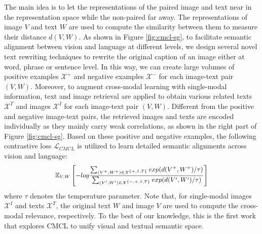 \documentclass[11pt,a4paper]{article}
\begin{document}
The main idea is to let the representations of the paired image and text near in the representation space while the non-paired far away.
The representations of image $V$ and text $W$ are used to compute the similarity between them to measure their distance $d(V, W)$.
As shown in Figure \ref{fig:cmcl-sg}, to facilitate semantic alignment between vision and language at different levels, we design several novel text rewriting techniques to rewrite the original caption of an image either at word, phrase or sentence level.
In this way, we can create large volumes of positive examples $\mathcal{X^+}$ and negative examples $\mathcal{X^-}$ for each image-text pair $(V, W)$.
Moreover, to augment cross-modal learning with single-modal information, text and image retrieval are applied to obtain various related texts $\mathcal{X}^T$ and images $\mathcal{X}^I$ for each image-text pair $(V, W)$.
Different from the positive and negative image-text pairs, the retrieved images and texts are encoded individually as they  mainly carry weak correlations, as shown in the right part of Figure \ref{fig:cmcl-sg}.
Based on these positive and negative examples, the following contrastive loss $\mathcal{L}_{CMCL}$ is utilized to learn detailed semantic alignments across vision and language:
\begin{equation}
\small
\begin{aligned}
      \mathbb{E}_{V,W} \left[ -log \frac{\sum_{(V^+,W^+) \in \mathcal{X}^{\{+,I,T\}}} exp(d(V^+,W^+)/ \tau)} {\sum_{(V',W') \in \mathcal{X}^{\{-,+,I,T\}}} exp(d(V',W')/ \tau)} \right]
\end{aligned}
\label{eq-cmcl}
\end{equation}
where $\tau$ denotes the temperature parameter. Note that, for single-modal images $\mathcal{X}^I$ and texts $\mathcal{X}^T$, the original text $W$ and image $V$ are used to compute the cross-modal relevance, respectively. To the best of our knowledge, this is the first work that explores CMCL to unify visual and textual semantic space.
\end{document}
